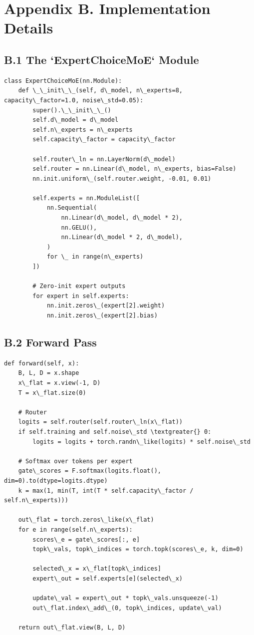 \section{Appendix B. Implementation Details}

\subsection{B.1 The `ExpertChoiceMoE` Module}

\begin{lstlisting}
class ExpertChoiceMoE(nn.Module):
    def \_\_init\_\_(self, d\_model, n\_experts=8, capacity\_factor=1.0, noise\_std=0.05):
        super().\_\_init\_\_()
        self.d\_model = d\_model
        self.n\_experts = n\_experts
        self.capacity\_factor = capacity\_factor
        
        self.router\_ln = nn.LayerNorm(d\_model)
        self.router = nn.Linear(d\_model, n\_experts, bias=False)
        nn.init.uniform\_(self.router.weight, -0.01, 0.01)
        
        self.experts = nn.ModuleList([
            nn.Sequential(
                nn.Linear(d\_model, d\_model * 2),
                nn.GELU(),
                nn.Linear(d\_model * 2, d\_model),
            )
            for \_ in range(n\_experts)
        ])
        
        # Zero-init expert outputs
        for expert in self.experts:
            nn.init.zeros\_(expert[2].weight)
            nn.init.zeros\_(expert[2].bias)
\end{lstlisting}

\subsection{B.2 Forward Pass}

\begin{lstlisting}
def forward(self, x):
    B, L, D = x.shape
    x\_flat = x.view(-1, D)
    T = x\_flat.size(0)
    
    # Router
    logits = self.router(self.router\_ln(x\_flat))
    if self.training and self.noise\_std \textgreater{} 0:
        logits = logits + torch.randn\_like(logits) * self.noise\_std
    
    # Softmax over tokens per expert
    gate\_scores = F.softmax(logits.float(), dim=0).to(dtype=logits.dtype)
    k = max(1, min(T, int(T * self.capacity\_factor / self.n\_experts)))
    
    out\_flat = torch.zeros\_like(x\_flat)
    for e in range(self.n\_experts):
        scores\_e = gate\_scores[:, e]
        topk\_vals, topk\_indices = torch.topk(scores\_e, k, dim=0)
        
        selected\_x = x\_flat[topk\_indices]
        expert\_out = self.experts[e](selected\_x)
        
        update\_val = expert\_out * topk\_vals.unsqueeze(-1)
        out\_flat.index\_add\_(0, topk\_indices, update\_val)
    
    return out\_flat.view(B, L, D)
\end{lstlisting}

